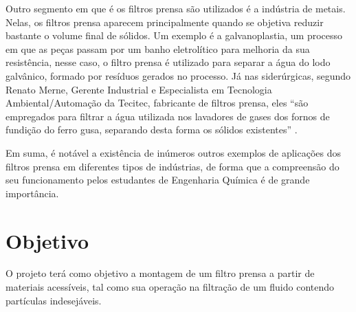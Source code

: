 Outro segmento em que é os filtros prensa são utilizados é a indústria de
metais. Nelas, os filtros prensa aparecem principalmente quando se objetiva
reduzir bastante o volume final de sólidos. Um exemplo é a galvanoplastia, um
processo em que as peças passam por um banho eletrolítico para melhoria da sua
resistência, nesse caso, o filtro prensa é utilizado para separar a água do lodo
galvânico, formado por resíduos gerados no processo. Já nas siderúrgicas,
segundo Renato Merne, Gerente Industrial e Especialista em Tecnologia
Ambiental/Automação da Tecitec, fabricante de filtros prensa, eles ``são
empregados para filtrar a água utilizada nos lavadores de gases dos fornos de
fundição do ferro gusa, separando desta forma os sólidos existentes''
.

Em suma, é notável a existência de inúmeros outros exemplos de aplicações dos
filtros prensa em diferentes tipos de indústrias, de forma que a compreensão do
seu funcionamento pelos estudantes de Engenharia Química é de grande
importância.

\section{Objetivo}\label{sec:objetivos} 

O projeto terá como objetivo a montagem de um filtro prensa a partir de
materiais acessíveis, tal como sua operação na filtração de um fluido contendo
partículas indesejáveis.


